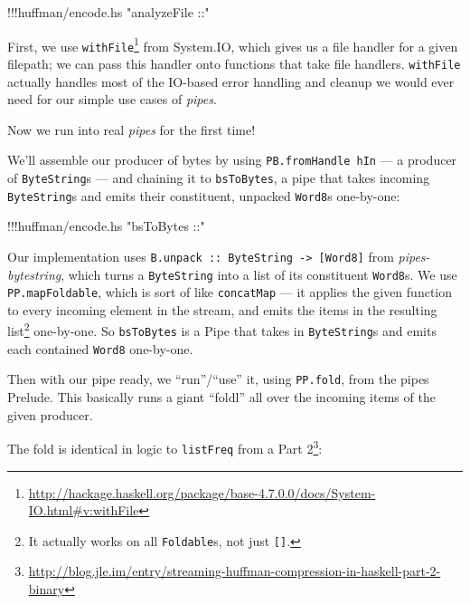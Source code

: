\documentclass[]{article}
\newenvironment{Shaded}{}{}
\newcommand{\StringTok}[1]{\textcolor[rgb]{0.25,0.44,0.63}{{#1}}}
\newcommand{\FunctionTok}[1]{\textcolor[rgb]{0.02,0.16,0.49}{{#1}}}
\newcommand{\NormalTok}[1]{{#1}}
\renewcommand{\href}[2]{#2\footnote{\url{#1}}}
\begin{document}
\begin{Shaded}
\begin{Highlighting}[]
\FunctionTok{!!!}\NormalTok{huffman}\FunctionTok{/}\NormalTok{encode}\FunctionTok{.}\NormalTok{hs }\StringTok{"analyzeFile ::"}
\end{Highlighting}
\end{Shaded}

First, we use
\href{http://hackage.haskell.org/package/base-4.7.0.0/docs/System-IO.html\#v:withFile}{\texttt{withFile}}
from System.IO, which gives us a file handler for a given filepath; we
can pass this handler onto functions that take file handlers.
\texttt{withFile} actually handles most of the IO-based error handling
and cleanup we would ever need for our simple use cases of \emph{pipes}.

Now we run into real \emph{pipes} for the first time!

We'll assemble our producer of bytes by using
\texttt{PB.fromHandle\ hIn} --- a producer of \texttt{ByteString}s ---
and chaining it to \texttt{bsToBytes}, a pipe that takes incoming
\texttt{ByteString}s and emits their constituent, unpacked
\texttt{Word8}s one-by-one:

\begin{Shaded}
\begin{Highlighting}[]
\FunctionTok{!!!}\NormalTok{huffman}\FunctionTok{/}\NormalTok{encode}\FunctionTok{.}\NormalTok{hs }\StringTok{"bsToBytes ::"}
\end{Highlighting}
\end{Shaded}

Our implementation uses
\texttt{B.unpack\ ::\ ByteString\ -\textgreater{}\ {[}Word8{]}} from
\emph{pipes-bytestring}, which turns a \texttt{ByteString} into a list
of its constituent \texttt{Word8}s. We use \texttt{PP.mapFoldable},
which is sort of like \texttt{concatMap} --- it applies the given
function to every incoming element in the stream, and emits the items in
the resulting list\footnote{It actually works on all \texttt{Foldable}s,
  not just \texttt{{[}{]}}.} one-by-one. So \texttt{bsToBytes} is a Pipe
that takes in \texttt{ByteString}s and emits each contained
\texttt{Word8} one-by-one.

Then with our pipe ready, we ``run''/``use'' it, using \texttt{PP.fold},
from the pipes Prelude. This basically runs a giant ``foldl'' all over
the incoming items of the given producer.

The fold is identical in logic to \texttt{listFreq} from a
\href{http://blog.jle.im/entry/streaming-huffman-compression-in-haskell-part-2-binary}{Part
2}:
\end{document}
